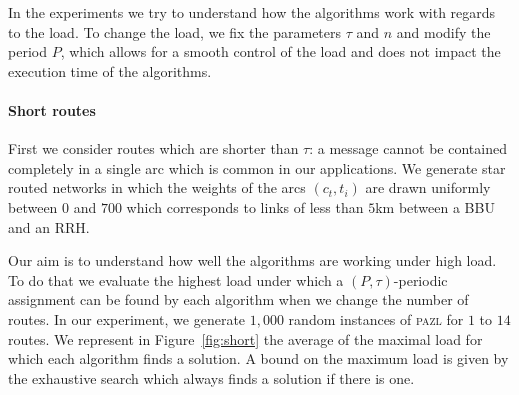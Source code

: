 \documentclass[10pt, conference, letterpaper]{IEEEtran}
\newcommand\pazl{\textsc{pazl}\xspace}
\begin{document}
       In the experiments we try to understand how the algorithms work with regards to the load. To change the load, we fix the parameters $\tau$ and $n$ and modify the period $P$, which allows for a smooth control of the load and does not impact the execution time of the algorithms.
      

      \paragraph{Short routes}
      
      First we consider routes which are shorter than $\tau$: a message cannot be contained completely in a single arc which is common in our applications. We generate star routed networks in which the weights of the arcs $(c_t,t_i)$ are drawn uniformly between $0$ and $700$ which corresponds to links of less than $5$km between a BBU and an RRH. 
      
      Our aim is to understand how well the algorithms are working under high load. To do that we evaluate the highest load 
      under which a $(P,\tau)$-periodic assignment can be found by each algorithm when we change the number of routes. 
      In our experiment, we generate $1,000$ random instances of \pazl for $1$ to $14$ routes. We represent in Figure~\ref{fig:short} the average of the maximal load for which each algorithm finds a solution. A bound on the maximum load is given by the exhaustive search which always finds a solution if there is one. 
      
\end{document}
